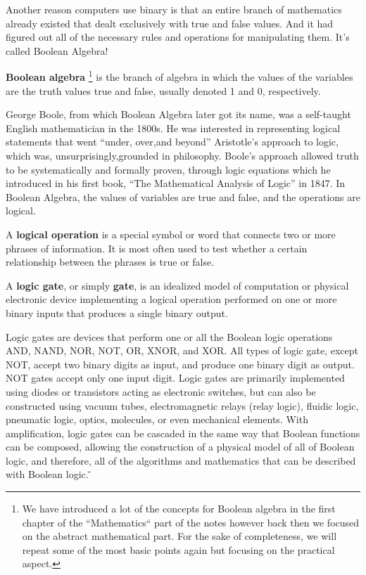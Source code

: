 Another reason computers use binary is that an entire branch of mathematics already existed that dealt exclusively
with true and false values. And it had figured out all of the necessary rules and operations for manipulating them.
It's called Boolean Algebra!

\textbf{Boolean algebra} \footnote{We have introduced a lot of the concepts for Boolean algebra in the first chapter
of the ``Mathematics`` part of the notes however back then we focused on the abstract mathematical part. For the sake
of completeness, we will repeat some of the most basic points again but focusing on the practical aspect.} is the
branch of algebra in which the values of the variables are the truth values true and false, usually denoted 1 and 0,
respectively.
\ed

George Boole, from which Boolean Algebra later got its name, was a self-taught English mathematician in the 1800s. He
was interested in representing logical statements that went ``under, over,and beyond'' Aristotle's approach to logic,
which was, unsurprisingly,grounded in philosophy. Boole's approach allowed truth to be systematically and formally
proven, through logic equations which he introduced in his first book, ``The Mathematical Analysis of Logic'' in 1847.
In Boolean Algebra, the values of variables are true and false, and the operations are logical.

A \textbf{logical operation} is a special symbol or word that connects two or more phrases of information. It is most
often used to test whether a certain relationship between the phrases is true or false.
\ed

A \textbf{logic gate}, or simply \textbf{gate}, is an idealized model of computation or physical electronic device
implementing a logical operation performed on one or more binary inputs that produces a single binary output.
\ed

Logic gates are devices that perform one or all the Boolean logic operations AND, NAND, NOR, NOT, OR, XNOR, and XOR.
All types of logic gate, except NOT, accept two binary digits as input, and produce one binary digit as output. NOT
gates accept only one input digit. Logic gates are primarily implemented using diodes or transistors acting as
electronic switches, but can also be constructed using vacuum tubes, electromagnetic relays (relay logic), fluidic
logic, pneumatic logic, optics, molecules, or even mechanical elements. With amplification, logic gates can be
cascaded in the same way that Boolean functions can be composed, allowing the construction of a physical model of all
of Boolean logic, and therefore, all of the algorithms and mathematics that can be described with Boolean logic. \v

